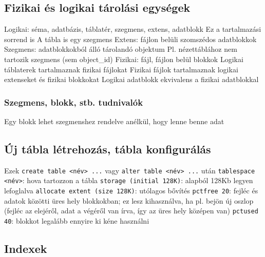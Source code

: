 \documentclass[12pt,a4paper]{article}
\begin{document}
\pagebreak

\subsection{Fizikai és logikai tárolási egységek}

\begin{outline}
	\1 Logikai: séma, adatbázis, táblatér, szegmens, extens, adatblokk
		\2 Ez a tartalmazási sorrend is
		\2 A tábla is egy szegmens
		\2 Extens: fájlon belüli szomszédos adatblokkok
		\2 Szegmens: adatblokkokból álló tárolandó objektum
			\3 Pl. nézettáblához nem tartozik szegmens (sem object\_id)
	\1 Fizikai: fájl, fájlon belül blokkok
	\1 Logikai táblaterek tartalmaznak fizikai fájlokat
	\1 Fizikai fájlok tartalmaznak logikai extenseket és fizikai blokkokat
	\1 Logikai adatblokk ekvivalens a fizikai adatblokkal
\end{outline}

\subsubsection{Szegmens, blokk, stb. tudnivalók}

\begin{outline}
	\1 Egy blokk lehet szegmenshez rendelve anélkül, hogy lenne benne adat
\end{outline}

\subsection{Új tábla létrehozás, tábla konfigurálás}

\begin{outline}
	\1 Ezek \texttt{create table <név> ...} vagy \texttt{alter table <név> ...} után
	\1 \texttt{tablespace <név>}: hova tartozzon a tábla
	\1 \texttt{storage (initial 128K)}: alapból 128Kb legyen lefoglalva
		\2 \texttt{allocate extent (size 128K)}: utólagos bővítés
	\1 \texttt{pctfree 20}: fejléc és adatok közötti üres hely blokkokban; ez lesz kihasználva, ha pl. bejön új oszlop (fejléc az elejéről, adat a végéről van írva, így az üres hely középen van)
	\1 \texttt{pctused 40}: blokkot legalább ennyire ki kéne használni
\end{outline}

\pagebreak

\subsection{Indexek}
\end{document}

